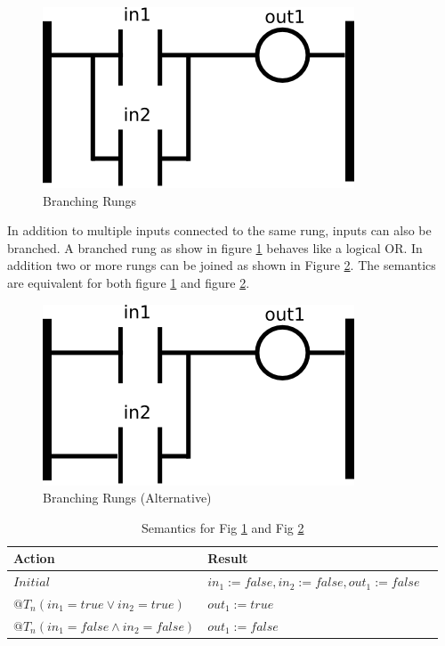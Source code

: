 \begin{figure}[h]
    \centering
    \includegraphics[width=\imgsmall]{./images/intro_fig3.png}
    \caption{Branching Rungs}
    \label{fig:intro_fig3}
\end{figure}


In addition to multiple inputs connected to the same rung, inputs can also be branched. A branched rung as
show in figure \ref{fig:intro_fig3} behaves like a logical OR. In addition two or more rungs can be joined
as shown in Figure \ref{fig:intro_fig3a}. The semantics are equivalent for both figure \ref{fig:intro_fig3} and 
figure \ref{fig:intro_fig3a}.

\begin{figure}[h]
    \centering
    \includegraphics[width=\imgsmall]{./images/intro_fig3a.png}
    \caption{Branching Rungs (Alternative)}
    \label{fig:intro_fig3a}
\end{figure}

\begin{table}[h]
    \centering
       \begin{tabular}{|l|l|l|}
        \hline
        Action & Result \\
        \hline
        $Initial$ & $in_1 := false, in_2 := false, out_1 := false$\\
        \hline
        $@T_n(in_1 = true \vee in_2 = true)$ & $out_1 := true$ \\
        \hline
        $@T_n(in_1 = false \wedge in_2 = false)$ & $out_1 := false$\\
        \hline
    \end{tabular}
    \caption{Semantics for Fig \ref{fig:intro_fig3} and Fig \ref{fig:intro_fig3a}}
    \label{table:table_for_fig3}
\end{table}

